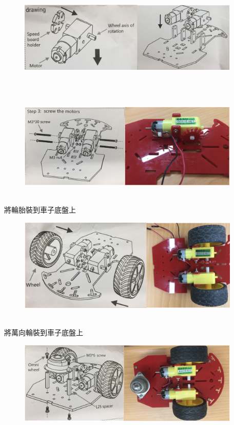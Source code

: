 \documentclass{article}
\begin{document}
\\
\begin{figure}[htp]
    \begin{center}
        \includegraphics[width=300pt]{pic/1_1_14.png}
    \end{center}
\end{figure}
\\
\\
\begin{figure}[htp]
    \begin{center}
        \includegraphics[width=300pt]{pic/1_1_15.png}
    \end{center}
\end{figure}
\\
將輪胎裝到車子底盤上
\\
\begin{figure}[htp]
    \begin{center}
        \includegraphics[width=300pt]{pic/1_1_16.png}
    \end{center}
\end{figure}
\\
將萬向輪裝到車子底盤上
\\
\begin{figure}[htp]
    \begin{center}
        \includegraphics[width=300pt]{pic/1_1_17.png}
    \end{center}
\end{figure}
\end{document}
